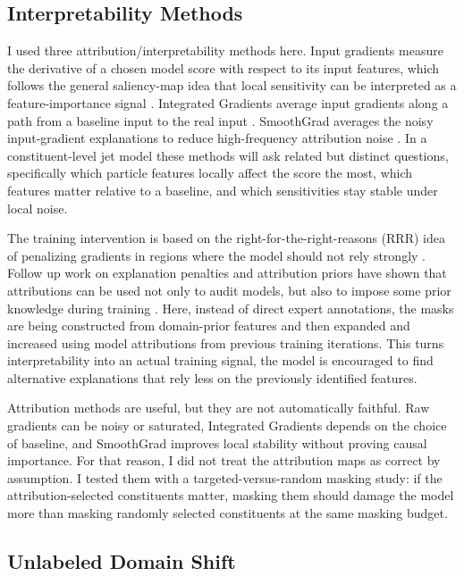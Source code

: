 \documentclass[11pt]{article}
\begin{document}
\subsection{Interpretability Methods}

I used three attribution/interpretability methods here. Input gradients measure the derivative of a chosen model score with respect to its input features, which follows the general saliency-map idea that local sensitivity can be interpreted as a feature-importance signal  \cite{simonyan2014deep}. Integrated Gradients average input gradients along a path from a baseline input to the real input \cite{sundararajan2017axiomatic}. SmoothGrad averages the noisy input-gradient explanations to reduce high-frequency attribution noise  \cite{smilkov2017smoothgrad}. In a constituent-level jet model these methods will ask related but distinct questions, specifically which particle features locally affect the score the most, which features matter relative to a baseline, and which sensitivities stay stable under local noise.


The training intervention is based on the right-for-the-right-reasons (RRR) idea of penalizing gradients in regions where the model should not rely strongly \cite{ross2017right}. Follow up work on explanation penalties and attribution priors have shown that attributions can be used not only to audit models, but also to impose some prior knowledge during training \cite{rieger2020interpretations,erion2021improving}. Here, instead of direct expert annotations, the masks are being constructed from domain-prior features and then expanded and increased using model attributions from previous training iterations. This turns interpretability into an actual training signal, the model is encouraged to find alternative explanations that rely less on the previously identified features.

Attribution methods are useful, but they are not automatically faithful. Raw gradients can be noisy or saturated, Integrated Gradients depends on the choice of baseline, and SmoothGrad improves local stability without proving causal importance. For that reason, I did not treat the attribution maps as correct by assumption. I tested them with a targeted-versus-random masking study: if the attribution-selected constituents matter, masking them should damage the model more than masking randomly selected constituents at the same masking budget.


\subsection{Unlabeled Domain Shift}
\end{document}
